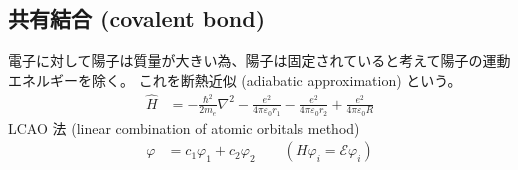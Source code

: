 \documentclass[uplatex,dvipdfmx,a4paper,11pt]{jlreq}
\newcommand{\E}{\mathcal{E}}
\begin{document}
\subsection{共有結合 (covalent bond)}
電子に対して陽子は質量が大きい為、陽子は固定されていると考えて陽子の運動エネルギーを除く。
これを断熱近似 (adiabatic approximation) という。
\begin{align}
  \hat{H} & = -\frac{\hbar^2}{2m_e}\nabla^2 - \frac{e^2}{4\pi\varepsilon_0r_1} - \frac{e^2}{4\pi\varepsilon_0r_2} + \frac{e^2}{4\pi\varepsilon_0R}
\end{align}
LCAO 法 (linear combination of atomic orbitals method)
\begin{align}
  \varphi & = c_1\varphi_1 + c_2\varphi_2 \qquad (H\varphi_i = \E\varphi_i)
\end{align}
\end{document}
